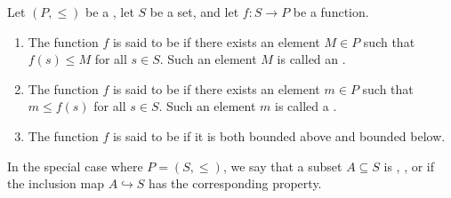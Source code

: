 \begin{definition} \label{definition:bounded_above_below_and_bounded_function_on_a_subset_of_an_ordered_set}
    Let $(P,\leq)$ be a , let $S$ be a set, and let $f : S \to P$ be a function.

    \begin{enumerate}
        \item The function $f$ is said to be  if there exists an element $M \in P$ such that $f(s) \leq M$ for all $s \in S$. Such an element $M$ is called an .

        \item The function $f$ is said to be  if there exists an element $m \in P$ such that $m \leq f(s)$ for all $s \in S$. Such an element $m$ is called a .

        \item The function $f$ is said to be  if it is both bounded above and bounded below.
    \end{enumerate}

    In the special case where $P = (S,\leq)$, we say that a subset $A \subseteq S$ is , , or  if the inclusion map $A \hookrightarrow S$ has the corresponding property.
\end{definition}

